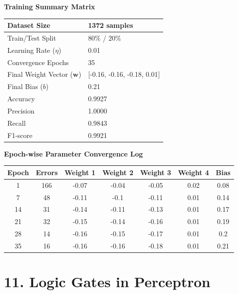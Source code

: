 \documentclass[11pt]{article}
\begin{document}
\textbf{Training Summary Matrix}
\begin{center}
\begin{tabular}{|p{6cm}|p{7cm}|}
\hline
Dataset Size & 1372 samples \\ \hline
Train/Test Split & 80\% / 20\% \\ \hline
Learning Rate ($\eta$) & 0.01 \\ \hline
Convergence Epochs & 35 \\ \hline
Final Weight Vector ($\mathbf{w}$) & [-0.16, -0.16, -0.18, 0.01] \\ \hline
Final Bias ($b$) & 0.21 \\ \hline
Accuracy & 0.9927 \\ \hline
Precision & 1.0000 \\ \hline
Recall & 0.9843 \\ \hline
F1-score & 0.9921 \\ \hline
\end{tabular}
\end{center}

\vspace{3mm}
\textbf{Epoch-wise Parameter Convergence Log}
\begin{center}
\begin{longtable}{|c|c|c|c|c|c|c|}
\hline
\textbf{Epoch} & \textbf{Errors} & \textbf{Weight 1} & \textbf{Weight 2} & \textbf{Weight 3} & \textbf{Weight 4} & \textbf{Bias}\\ \hline
1 & 166 & -0.07 & -0.04 & -0.05 & 0.02 & 0.08 \\ \hline
7 & 48 & -0.11 & -0.1 & -0.11 & 0.01 & 0.14 \\ \hline
14 & 31 & -0.14 & -0.11 & -0.13 & 0.01 & 0.17 \\ \hline
21 & 32 & -0.15 & -0.14 & -0.16 & 0.01 & 0.19 \\ \hline
28 & 14 & -0.16 & -0.15 & -0.17 & 0.01 & 0.2 \\ \hline
35 & 16 & -0.16 & -0.16 & -0.18 & 0.01 & 0.21 \\ \hline
\hline
\end{longtable}
\end{center}


\section*{11. Logic Gates in Perceptron}
\end{document}
